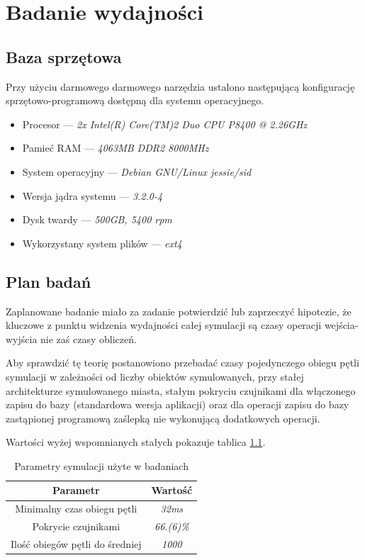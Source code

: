 \chapter{Badanie wydajności}
\section{Baza sprzętowa}
\par{
Przy użyciu darmowego darmowego narzędzia ustalono następującą konfigurację sprzętowo-programową dostępną dla systemu operacyjnego.
\begin{itemize}
\item Procesor --- \textit{2x Intel(R) Core(TM)2 Duo CPU P8400 @ 2.26GHz}
\item Pamieć RAM --- \textit{4063MB DDR2 8000MHz}
\item System operacyjny --- \textit{Debian GNU/Linux jessie/sid}
\item Wersja jądra systemu --- \textit{3.2.0-4}
\item Dysk twardy --- \textit{500GB, 5400 rpm}
\item Wykorzystany system plików --- \textit{ext4}
\end{itemize}
}

\section{Plan badań}
\par{
Zaplanowane badanie miało za zadanie potwierdzić lub zaprzeczyć hipotezie, że kluczowe z punktu widzenia wydajności całej symulacji są czasy operacji wejścia-wyjścia nie zaś czasy obliczeń.
}
\par{
Aby sprawdzić tę teorię postanowiono przebadać czasy pojedynczego obiegu pętli symulacji w zależności od liczby obiektów symulowanych, przy stałej architekturze symulowanego miasta, stałym pokryciu czujnikami dla włączonego zapisu do bazy (standardowa wersja aplikacji) oraz dla operacji zapisu do bazy zastąpionej programową zaślepką nie wykonującą dodatkowych operacji.
}
\par{
Wartości wyżej wspomnianych stałych pokazuje tablica \ref{cost_table}.
}
\begin{table}[t]
\caption{Parametry symulacji użyte w badaniach}
\label{cost_table}
\begin{center}
\begin{tabular}{|c|c|}
  \hline 
  \textbf{Parametr} & \textbf{Wartość} \\
  \hline
  Minimalny czas obiegu pętli & \textit{32ms} \\
  Pokrycie czujnikami & \textit{66.(6)\%} \\
  Ilość obiegów pętli do średniej & \textit{1000} \\
  \hline  
\end{tabular}
\end{center}
\end{table}


